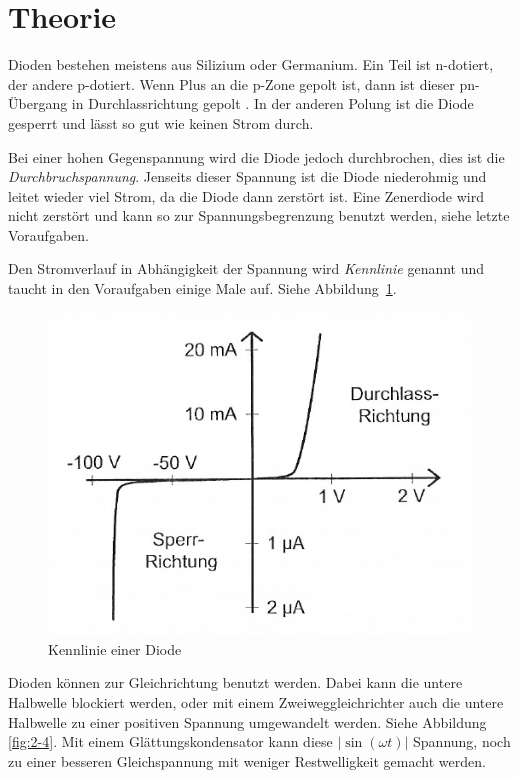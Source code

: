 
\FloatBarrier
\section{Theorie}

Dioden bestehen meistens aus Silizium oder Germanium. Ein Teil ist n-dotiert,
der andere p-dotiert. Wenn Plus an die p-Zone gepolt ist, dann ist dieser
pn-Übergang in Durchlassrichtung gepolt
\cite[§14.1]{beuth/elementare_elektronik}. In der anderen Polung ist die
Diode gesperrt und lässt so gut wie keinen Strom durch.

Bei einer hohen Gegenspannung wird die Diode jedoch durchbrochen, dies ist die
\emph{Durchbruchspannung}. Jenseits dieser Spannung ist die Diode niederohmig
und leitet wieder viel Strom, da die Diode dann zerstört ist. Eine Zenerdiode
wird nicht zerstört und kann so zur Spannungsbegrenzung benutzt werden, siehe
letzte Voraufgaben.

Den Stromverlauf in Abhängigkeit der Spannung wird \emph{Kennlinie} genannt und
taucht in den Voraufgaben einige Male auf. Siehe Abbildung~\ref{fig:2-2}.

\begin{figure}[htbp]
	\centering
	\includegraphics[width=.45\linewidth]{Bilder_aus_Anleitung/2-2.png}
	\caption{%
		Kennlinie einer Diode \cite[Abbildung~2.2]{physik313-Anleitung}
	}
	\label{fig:2-2}
\end{figure}

Dioden können zur Gleichrichtung benutzt werden. Dabei kann die untere
Halbwelle blockiert werden, oder mit einem Zweiweggleichrichter auch die untere
Halbwelle zu einer positiven Spannung umgewandelt werden. Siehe Abbildung
\ref{fig:2-4}. Mit einem Glättungskondensator kann diese $|\sin(\omega t)|$
Spannung, noch zu einer besseren Gleichspannung mit weniger Restwelligkeit
gemacht werden.


